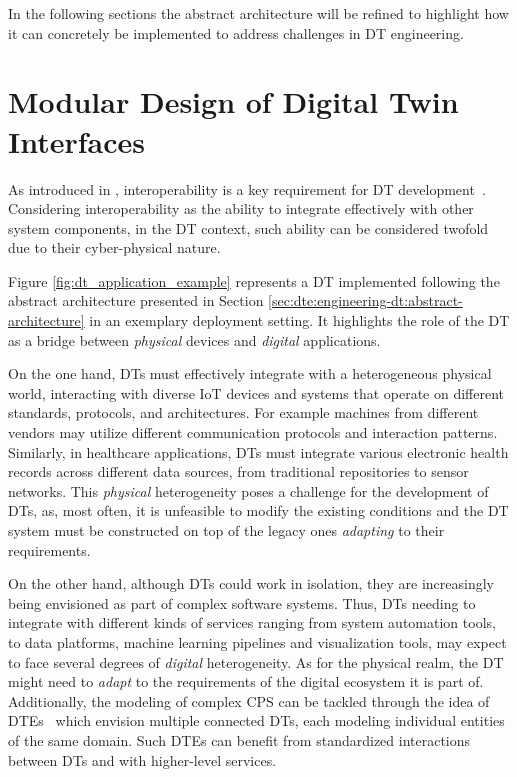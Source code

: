 In the following sections the abstract architecture will be refined to highlight how it can concretely be implemented to address challenges in \ac{DT} engineering.


\section{Modular Design of Digital Twin Interfaces}

As introduced in , interoperability is a key requirement for \ac{DT} development~\cite{Acharya_Khan_Päivärinta_2024,Klar_Arvidsson_Angelakis_2024}.
%
Considering interoperability as the ability to integrate effectively with other system components,
in the \ac{DT} context, such ability can be considered twofold due to their cyber-physical nature.

Figure \ref{fig:dt_application_example} represents a \ac{DT} implemented following the abstract architecture presented in Section \ref{sec:dte:engineering-dt:abstract-architecture} in an exemplary deployment setting.
%
It highlights the role of the \ac{DT} as a bridge between \emph{physical} devices and \emph{digital} applications.

On the one hand, \acp{DT} must effectively integrate with a heterogeneous physical world, interacting with diverse \ac{IoT} devices and systems that operate on different standards, protocols, and architectures.
%
For example machines from different vendors may utilize different communication protocols and interaction patterns.
%
Similarly, in healthcare applications, \acp{DT} must integrate various electronic health records across different data sources, from traditional repositories to sensor networks.
%
This \emph{physical} heterogeneity poses a challenge for the development of \acp{DT}, as, most often, it is unfeasible to modify the existing conditions and the \ac{DT} system must be constructed on top of the legacy ones \emph{adapting} to their requirements.

On the other hand, although \acp{DT} could work in isolation, they are increasingly being envisioned as part of complex software systems.
%
Thus, \acp{DT} needing to integrate with different kinds of services ranging from system automation tools, to data platforms, machine learning pipelines and visualization tools, may expect to face several degrees of \emph{digital} heterogeneity.
%
As for the physical realm, the \ac{DT} might need to \emph{adapt} to the requirements of the digital ecosystem it is part of.
%
Additionally, the modeling of complex \ac{CPS} can be tackled through the idea of \acp{DTE}~\cite{web-of-dt-ricci-2022} which envision multiple connected \acp{DT}, each modeling individual entities of the same domain. 
Such \acp{DTE} can benefit from standardized interactions between \acp{DT} and with higher-level services.

